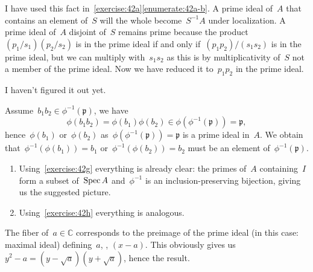 \begin{exercise} %
  \label{exercise:42h}
  I have used this fact in~\autoref{exercise:42a}\ref{enumerate:42a-b}. A prime ideal of~$A$ that contains an element of~$S$ will the whole become~$S^{-1}A$ under localization. A prime ideal of~$A$ disjoint of~$S$ remains prime because the product~$(p_1/s_1)(p_2/s_2)$ is in the prime ideal if and only if~$(p_1p_2)/(s_1s_2)$ is in the prime ideal, but we can multiply with~$s_1s_2$ as this is by multiplicativity of~$S$ not a member of the prime ideal. Now we have reduced it to~$p_1p_2$ in the prime ideal.
\end{exercise}

\begin{exercise} %
  I haven't figured it out yet.
\end{exercise}

\begin{exercise}
  Assume~$b_1b_2\in\phi^{-1}(\mathfrak{p})$, we have
  \begin{equation}
    \phi(b_1b_2)=\phi(b_1)\phi(b_2)\in\phi\left( \phi^{-1}(\mathfrak{p}) \right)=\mathfrak{p},
  \end{equation}
  hence~$\phi(b_1)$ or~$\phi(b_2)$ as~$\phi(\phi^{-1}(\mathfrak{p}))=\mathfrak{p}$ is a prime ideal in~$A$. We obtain that~$\phi^{-1}(\phi(b_1))=b_1$ or~$\phi^{-1}(\phi(b_2))=b_2$ must be an element of~$\phi^{-1}(\mathfrak{p})$.
\end{exercise}

\begin{exercise}
  \label{exercise:42k}
  \begin{enumerate}
    \item\label{enumerate:42k-a} Using~\autoref{exercise:42g} everything is already clear: the primes of~$A$ containing~$I$ form a subset of~$\operatorname{Spec} A$ and~$\phi^{-1}$ is an inclusion-preserving bijection, giving us the suggested picture.

    \item Using~\autoref{exercise:42h} everything is analogous.
  \end{enumerate}
\end{exercise}

\begin{exercise}
  The fiber of~$a\in\mathbb{C}$ corresponds to the preimage of the prime ideal (in this case: maximal ideal) defining~$a$, \ie, $(x-a)$. This obviously gives us~$y^2-a=(y-\sqrt{a})(y+\sqrt{a})$, hence the result.
\end{exercise}


